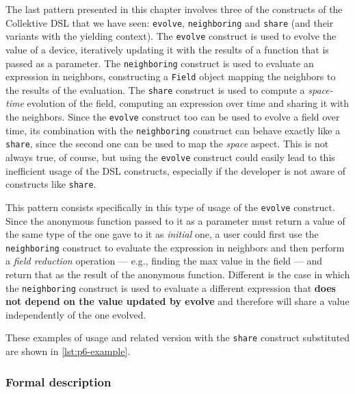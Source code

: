\documentclass[12pt,a4paper,openright,twoside]{book}
\begin{document}
The last pattern presented in this chapter involves three of the constructs of the 
Collektive DSL that we have seen: \lstinline{evolve}, \lstinline{neighboring}
and \lstinline{share} (and their variants with the yielding context).
%
The \lstinline{evolve} construct is used to evolve the value of a device,
iteratively updating it with the results of a function that is passed as a
parameter. The \lstinline{neighboring} construct is used to evaluate an
expression in neighbors, constructing a \lstinline{Field} object mapping the
neighbors to the results of the evaluation. The \lstinline{share} construct is
used to compute a \emph{space-time} evolution of the field, computing an
expression over time and sharing it with the neighbors. Since the
\lstinline{evolve} construct too can be used to evolve a field over time, its
combination with the \lstinline{neighboring} construct can behave exactly like a
\lstinline{share}, since the second one can be used to map the \emph{space}
aspect. 
%
This is not always true, of course, but using the \lstinline{evolve} construct
could easily lead to this inefficient usage of the DSL constructs,  especially
if the developer is not aware of constructs like \lstinline{share}.

This pattern consists specifically in this type of usage of the \lstinline{evolve}
construct. Since the anonymous function passed to it as a parameter must return
a value of the same type of the one gave to it as \emph{initial} one, a user could
first use the \lstinline{neighboring} construct to evaluate the expression in 
neighbors and then perform a \emph{field reduction} operation --- e.g., finding the
max value in the field --- and return that as the result of the anonymous function.
%
Different is the case in which the \lstinline{neighboring} construct is used to 
evaluate a different expression that \textbf{does not depend on the value updated
by evolve} and therefore will share a value independently of the one evolved.

These examples of usage and related version with the \lstinline{share} construct 
substituted are shown in \cref{lst:p6-example}.



\subsubsection{Formal description}
\end{document}
